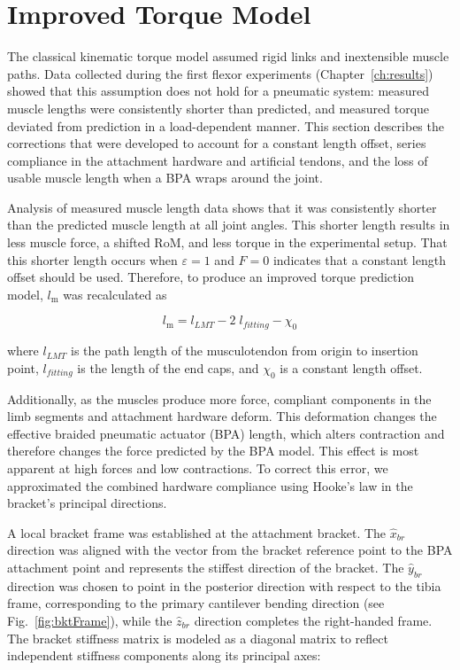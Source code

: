 \section{Improved Torque Model}\label{sec:improved_model}

The classical kinematic torque model assumed rigid links and inextensible muscle paths. Data collected during the first flexor experiments (Chapter~\ref{ch:results}) showed that this assumption does not hold for a pneumatic system: measured muscle lengths were consistently shorter than predicted, and measured torque deviated from prediction in a load-dependent manner. This section describes the corrections that were developed to account for a constant length offset, series compliance in the attachment hardware and artificial tendons, and the loss of usable muscle length when a BPA wraps around the joint.

Analysis of measured muscle length data shows that it was consistently shorter than the predicted muscle length at all joint angles. This shorter length results in less muscle force, a shifted RoM, and less torque in the experimental setup. That this shorter length occurs when $\varepsilon=1$ and $F=0$ indicates that a constant length offset should be used. Therefore, to produce an improved torque prediction model, $l_\text{m}$ was recalculated as

\begin{equation}
    l_\text{m} = l_{LMT} - 2\;l_{fitting} - \chi_{0} 
    \label{eq:Lm}
\end{equation}

where $l_{LMT}$ is the path length of the musculotendon from origin to insertion point, $l_{fitting}$ is the length of the end caps, and $\chi_{0}$ is a constant length offset. 

Additionally, as the muscles produce more force, compliant components in the limb segments and attachment hardware deform. This deformation changes the effective braided pneumatic actuator (BPA) length, which alters contraction and therefore changes the force predicted by the BPA model. This effect is most apparent at high forces and low contractions. To correct this error, we approximated the combined hardware compliance using Hooke's law in the bracket's principal directions.

A local bracket frame was established at the attachment bracket. The $\hat{x}_{br}$ direction was aligned with the vector from the bracket reference point to the BPA attachment point and represents the stiffest direction of the bracket. The $\hat{y}_{br}$ direction was chosen to point in the posterior direction with respect to the tibia frame, corresponding to the primary cantilever bending direction (see Fig.~\ref{fig:bktFrame}), while the $\hat{z}_{br}$ direction completes the right-handed frame. The bracket stiffness matrix is modeled as a diagonal matrix to reflect independent stiffness components along its principal axes:

